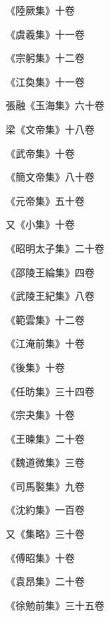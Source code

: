 \begin{pinyinscope}
 《陸厥集》十卷



 《虞羲集》十一卷



 《宗躬集》十二卷



 《江奐集》十一卷



 張融《玉海集》六十卷



 梁《文帝集》十八卷



 《武帝集》十卷



 《簡文帝集》八十卷



 《元帝集》五十卷



 又《小集》十卷



 《昭明太子集》二十卷



 《邵陵王綸集》四卷



 《武陵王紀集》八卷



 《範雲集》十二卷



 《江淹前集》十卷



 《後集》十卷



 《任昉集》三十四卷



 《宗夬集》十卷



 《王暕集》二十卷



 《魏道微集》三卷



 《司馬褧集》九卷



 《沈約集》一百卷



 又《集略》三十卷



 《傅昭集》十卷



 《袁昂集》二十卷



 《徐勉前集》三十五卷




\end{pinyinscope}
